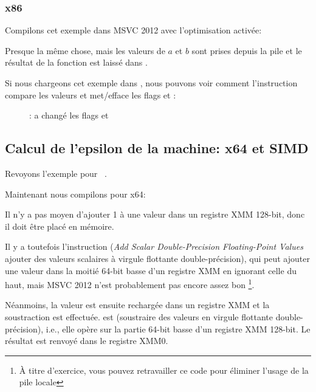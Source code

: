 \clearpage
\subsubsection{x86}

Compilons cet exemple dans MSVC 2012 avec l'optimisation activée:



Presque la même chose, mais les valeurs de $a$ et $b$ sont prises depuis la pile
et le résultat de la fonction est laissé dans .

Si nous chargeons cet exemple dans \olly, nous pouvons voir comment l'instruction
 compare les valeurs et met/efface les flags \CF et \PF:

\begin{figure}[H]
\centering
{}
\caption{\olly:  a changé les flags \CF et \PF}
\label{fig:FPU_SIMD_d_max_olly}
\end{figure}

\subsection{Calcul de l'epsilon de la machine: x64 et SIMD}
\label{machine_epsilon_x64_and_SIMD}

Revoyons l'exemple  pour \Tdouble\ .

Maintenant nous compilons pour x64:



Il n'y a pas moyen d'ajouter 1 à une valeur dans un registre XMM 128-bit, donc il
doit être placé en mémoire.

Il y a toutefois l'instruction  (\emph{Add Scalar Double-Precision Floating-Point
Values} ajouter des valeurs scalaires à virgule flottante double-précision), qui
peut ajouter une valeur dans la moitié 64-bit basse d'un registre XMM en ignorant
celle du haut, mais MSVC 2012 n'est probablement pas encore assez bon \footnote{À
titre d'exercice, vous pouvez retravailler ce code pour éliminer l'usage de la pile
locale}.

Néanmoins, la valeur est ensuite rechargée dans un registre XMM et la soustraction
est effectuée.
 est  (soustraire
des valeurs en virgule flottante double-précision), i.e., elle opère sur la partie
64-bit basse d'un registre XMM 128-bit.
Le résultat est renvoyé dans le registre XMM0.

